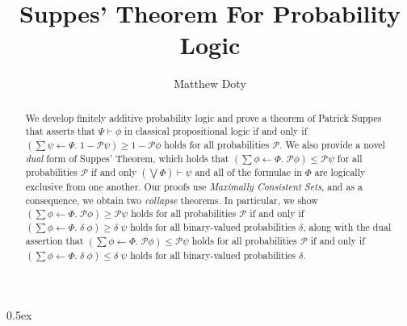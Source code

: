 \documentclass[11pt,a4paper]{report}
\begin{document}
\title{Suppes' Theorem For Probability Logic}
\author{Matthew Doty}

\maketitle

\begin{abstract}
  We develop finitely additive probability logic and prove a theorem
  of Patrick Suppes that asserts that $\Psi \vdash \phi$ in classical
  propositional logic if and only if
  $(\sum \psi \leftarrow \Psi.\; 1 - \mathcal{P} \psi) \geq 1 -
  \mathcal{P} \phi$ holds for all probabilities $\mathcal{P}$. We also
  provide a novel \emph{dual} form of Suppes' Theorem, which holds
  that
  $(\sum \phi \leftarrow \Phi.\; \mathcal{P} \phi) \leq \mathcal{P}
  \psi$ for all probabilities $\mathcal{P}$ if and only
  $\left(\bigvee \Phi\right) \vdash \psi$ and all of the formulae in
  $\Phi$ are logically exclusive from one another. Our proofs use
  \emph{Maximally Consistent Sets}, and as a consequence, we obtain
  two \emph{collapse} theorems. In particular, we show
  $(\sum \phi \leftarrow \Phi.\; \mathcal{P} \phi) \geq \mathcal{P}
  \psi$ holds for all probabilities $\mathcal{P}$ if and only if
  $(\sum \phi \leftarrow \Phi.\; \delta\; \phi) \geq \delta\; \psi$
  holds for all binary-valued probabilities $\delta$, along with the
  dual assertion that
  $(\sum \phi \leftarrow \Phi. \;\mathcal{P} \phi) \leq \mathcal{P}
  \psi$ holds for all probabilities $\mathcal{P}$ if and only if
  $(\sum \phi \leftarrow \Phi.\; \delta\; \phi) \leq \delta\; \psi$
  holds for all binary-valued probabilities $\delta$.
\end{abstract}

\tableofcontents

\newpage

\parindent 0pt\parskip 0.5ex





\end{document}
